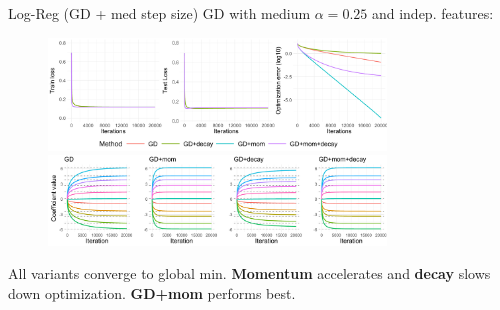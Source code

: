 \documentclass[11pt,compress,t,notes=noshow, xcolor=table]{beamer}
\begin{document}
\begin{vbframe}{Log-Reg (GD + med step size)}
\vspace{-0.4cm}
GD with medium $\alpha=0.25$ and indep. features:
\begin{figure}
            \includegraphics[width=0.8\textwidth]{slides/04-multivariate-first-order/figure_man/simu_linmod/GD_log_med_lr_iters.pdf} \\
             \includegraphics[width=0.8\textwidth]{slides/04-multivariate-first-order/figure_man/simu_linmod/GD_log_coef_med.pdf}\\
            \begin{footnotesize}
            \end{footnotesize}
\end{figure}
All variants converge to global min. \textbf{Momentum} accelerates
and \textbf{decay} slows down optimization. \textbf{GD+mom} performs best.
\end{vbframe}
\end{document}
